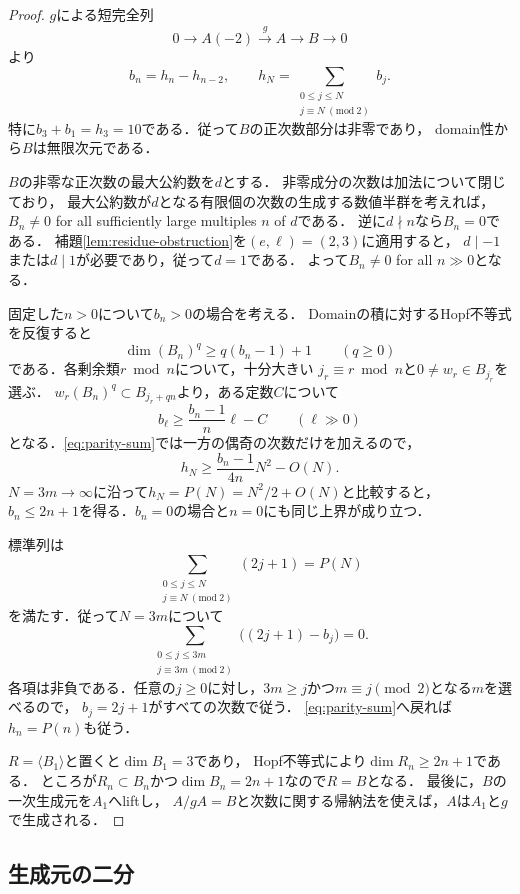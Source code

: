 \documentclass[11pt,a4paper]{ltjsarticle}
\begin{document}
\begin{proof}
$g$による短完全列
\[
 0\longrightarrow A(-2)\xrightarrow{\,g\,}A
 \longrightarrow B\longrightarrow0
\]
より
\begin{equation}
\label{eq:parity-sum}
 b_n=h_n-h_{n-2},\qquad
 h_N=\sum_{\substack{0\leq j\leq N\\j\equiv N\ (\mathrm{mod}\ 2)}} b_j.
\end{equation}
特に$b_3+b_1=h_3=10$である．従って$B$の正次数部分は非零であり，
domain性から$B$は無限次元である．

$B$の非零な正次数の最大公約数を$d$とする．
非零成分の次数は加法について閉じており，
最大公約数が$d$となる有限個の次数の生成する数値半群を考えれば，
$B_n\ne0$ for all sufficiently large multiples $n$ of $d$である．
逆に$d\nmid n$なら$B_n=0$である．
補題\ref{lem:residue-obstruction}を$(e,\ell)=(2,3)$に適用すると，
$d\mid-1$または$d\mid1$が必要であり，従って$d=1$である．
よって$B_n\ne0$ for all $n\gg0$となる．

固定した$n>0$について$b_n>0$の場合を考える．
Domainの積に対するHopf不等式を反復すると
\[
 \dim(B_n)^q\geq q(b_n-1)+1\qquad(q\geq0)
\]
である．各剰余類$r\bmod n$について，十分大きい
$j_r\equiv r\bmod n$と$0\ne w_r\in B_{j_r}$を選ぶ．
$w_r(B_n)^q\subset B_{j_r+qn}$より，ある定数$C$について
\[
 b_\ell\geq\frac{b_n-1}{n}\ell-C\qquad(\ell\gg0)
\]
となる．\eqref{eq:parity-sum}では一方の偶奇の次数だけを加えるので，
\[
 h_N\geq\frac{b_n-1}{4n}N^2-O(N).
\]
$N=3m\to\infty$に沿って$h_N=P(N)=N^2/2+O(N)$と比較すると，
$b_n\leq2n+1$を得る．$b_n=0$の場合と$n=0$にも同じ上界が成り立つ．

標準列は
\[
 \sum_{\substack{0\leq j\leq N\\j\equiv N\ (\mathrm{mod}\ 2)}}(2j+1)=P(N)
\]
を満たす．従って$N=3m$について
\[
 \sum_{\substack{0\leq j\leq3m\\j\equiv3m\ (\mathrm{mod}\ 2)}}
 \bigl((2j+1)-b_j\bigr)=0.
\]
各項は非負である．任意の$j\geq0$に対し，$3m\geq j$かつ$m\equiv j\pmod2$となる$m$を選べるので，
$b_j=2j+1$がすべての次数で従う．
\eqref{eq:parity-sum}へ戻れば$h_n=P(n)$も従う．

$R=\langle B_1\rangle$と置くと$\dim B_1=3$であり，
Hopf不等式により$\dim R_n\geq2n+1$である．
ところが$R_n\subset B_n$かつ$\dim B_n=2n+1$なので$R=B$となる．
最後に，$B$の一次生成元を$A_1$へliftし，
$A/gA=B$と次数に関する帰納法を使えば，$A$は$A_1$と$g$で生成される．
\end{proof}

\subsection{生成元の二分}
\end{document}
